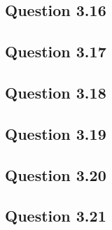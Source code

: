 \documentclass{article}
\begin{document}
\subsection*{Question 3.16}



\subsection*{Question 3.17}



\subsection*{Question 3.18}



\subsection*{Question 3.19}



\subsection*{Question 3.20}



\subsection*{Question 3.21}
\end{document}
